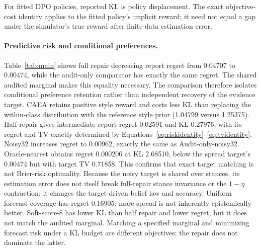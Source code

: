 \documentclass{article}
\begin{document}
For fitted DPO policies, reported KL is policy displacement. The exact
objective-cost identity applies to the fitted policy's implicit reward;
it need not equal a gap under the simulator's true reward after finite-data
estimation error.

\begin{table}[t]
\centering\small
\caption{Finite-action results: means $\pm$ 95\% Student-$t$ confidence
half-widths over ten independent runs. Style is only the style component of
Equation~\eqref{eq:rewardexperiment}, not measured human helpfulness. Target
information is given to audit-based methods. KL is relative to learned DPO.}
\label{tab:main}

\end{table}

\paragraph{Predictive risk and conditional preferences.}
Table~\ref{tab:main} shows full repair decreasing report regret from 0.04707 to
0.00474, while the audit-only comparator has exactly the same regret. The shared audited marginal makes this equality necessary. The
comparison therefore isolates conditional preference retention rather
than independent recovery of the evidence target. CAEA retains positive style reward and costs less
KL than replacing the within-class distribution with the reference style
prior (1.04799 versus 1.25375). Half repair
gives intermediate report regret 0.02591 and KL 0.27976, with its regret and TV exactly determined by Equations~\eqref{eq:riskidentity}--\eqref{eq:tvidentity}. Noisy32 increases regret to 0.00962, exactly the same as Audit-only-noisy32. Oracle-nearest obtains regret 0.000206 at KL 2.68510, below the spread target's 0.00474 but with target TV 0.71858. This confirms that exact target matching is not Brier-risk optimality. Because the noisy target is shared over stances, its estimation error does not itself break full-repair stance invariance or the $1-\eta$ contraction; it changes the target-driven belief law and accuracy. Uniform forecast coverage has regret 0.16905:
more spread is not inherently epistemically better. Soft-score-8 has lower KL
than half repair and lower regret, but it does not match the audited marginal.
Matching a specified marginal and minimizing forecast risk under a KL
budget are different objectives; the repair does not dominate the latter.
\end{document}
